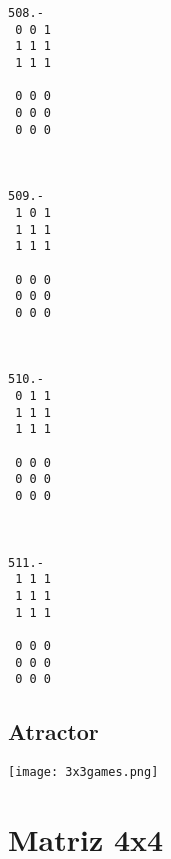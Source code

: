 \documentclass[a4paper,10pt]{article}
\begin{document}
\begin{multicols}{8}
\begin{verbatim}
508.-
 0 0 1
 1 1 1
 1 1 1

 0 0 0
 0 0 0
 0 0 0



509.-
 1 0 1
 1 1 1
 1 1 1

 0 0 0
 0 0 0
 0 0 0



510.-
 0 1 1
 1 1 1
 1 1 1

 0 0 0
 0 0 0
 0 0 0



511.-
 1 1 1
 1 1 1
 1 1 1

 0 0 0
 0 0 0
 0 0 0
\end{verbatim}

\end{multicols}

\subsection{Atractor}

\texttt{[image: 3x3games.png]}

\section{Matriz 4x4}
\end{document}
